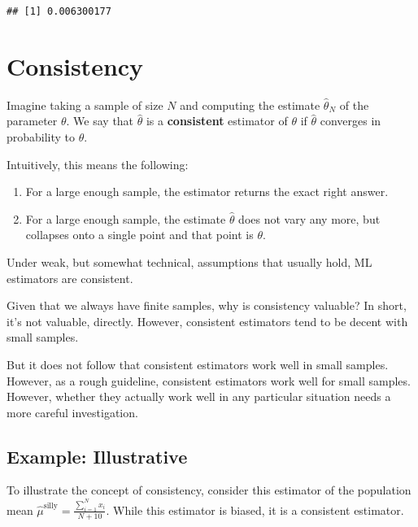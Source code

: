 \documentclass[
]{book}
\providecommand{\tightlist}{%
  \setlength{\itemsep}{0pt}\setlength{\parskip}{0pt}}
\begin{document}
\begin{verbatim}
## [1] 0.006300177
\end{verbatim}

\hypertarget{consistency}{%
\section{Consistency}\label{consistency}}

Imagine taking a sample of size \(N\) and computing the estimate
\(\hat{\theta}_N\) of the parameter \(\theta\). We say that
\(\hat{\theta}\) is a \textbf{consistent} estimator of \(\theta\) if
\(\hat{\theta}\) converges in probability to \(\theta\).

Intuitively, this means the following:

\begin{enumerate}
\def\labelenumi{\arabic{enumi}.}
\tightlist
\item
  For a large enough sample, the estimator returns the exact right
  answer.
\item
  For a large enough sample, the estimate \(\hat{\theta}\) does not vary
  any more, but collapses onto a single point and that point is
  \(\theta\).
\end{enumerate}

Under weak, but somewhat technical, assumptions that usually hold, ML
estimators are consistent.

Given that we always have finite samples, why is consistency valuable?
In short, it's not valuable, directly. However, consistent estimators
tend to be decent with small samples.

But it does not follow that consistent estimators work well in small
samples. However, as a rough guideline, consistent estimators work well
for small samples. However, whether they actually work well in any
particular situation needs a more careful investigation.

\hypertarget{example-illustrative}{%
\subsection{Example: Illustrative}\label{example-illustrative}}

To illustrate the concept of consistency, consider this estimator of the
population mean
\(\hat{\mu}^{\text{silly}} = \frac{\sum_{i = 1}^N x_i}{N + 10}\). While
this estimator is biased, it is a consistent estimator.
\end{document}
